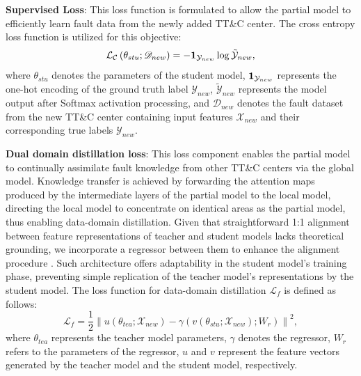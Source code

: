\textbf{Supervised Loss}: This loss function is formulated to allow the partial model 
to efficiently learn fault data from the newly added TT\&C center. 
The cross entropy loss function is utilized for this objective:
\begin{equation}
	{\mathcal {L_C}}\left( {{\theta _{stu}}; {{\mathscr D}_{new}}} \right) =  - {{\bf{1}}_{{\mathcal Y_{new}}}} \log { \tilde{\mathcal Y}_{new}},
	\label{eq: LC}
\end{equation}
\noindent where ${\theta _{stu}}$ denotes the parameters of the student model,
${{\bf{1}}_{{\mathcal Y_{new}}}}$ represents the one-hot encoding of the ground truth label ${\mathcal Y_{new}}$,
${\tilde{\mathcal Y}_{new}}$ represents the model output after Softmax activation processing,
and ${{\mathscr D}_{new}}$ denotes the fault dataset from the new TT\&C center 
containing input features ${\mathcal X_{new}}$ and their corresponding true labels ${\mathcal Y_{new}}$.

\textbf{Dual domain distillation loss}: 
This loss component enables the partial model to continually assimilate fault knowledge from other TT\&C centers via the global model. 
Knowledge transfer is achieved by forwarding the attention maps produced by the intermediate layers of the partial model to the local model, 
directing the local model to concentrate on identical areas as the partial model, 
thus enabling data-domain distillation. 
Given that straightforward 1:1 alignment between feature representations of teacher and student models lacks theoretical grounding, 
we incorporate a regressor between them to enhance the alignment procedure \cite{romero2014fitnets}. 
Such architecture offers adaptability in the student model's training phase, 
preventing simple replication of the teacher model's representations by the student model.
The loss function for data-domain distillation ${\mathcal L_{f}}$ is defined as follows:
\begin{equation}
	{\mathcal L_{f}} = \frac{1}{2}{\left\| {u\left( {{{\theta _{tea}}}; {\mathcal X_{new}}} \right) - \gamma \left( {v\left( {\theta _{stu}; {\mathcal X_{new}}} \right); {W_r}} \right)} \right\|^2},
	\label{eq: LKD-1}
\end{equation}
\noindent where ${\theta _{tea}}$ represents the teacher model parameters, 
$\gamma $ denotes the regressor, ${W_r}$ refers to the parameters of the regressor, 
$u$ and $v$ represent the feature vectors generated by the teacher model and the student model, respectively. 

